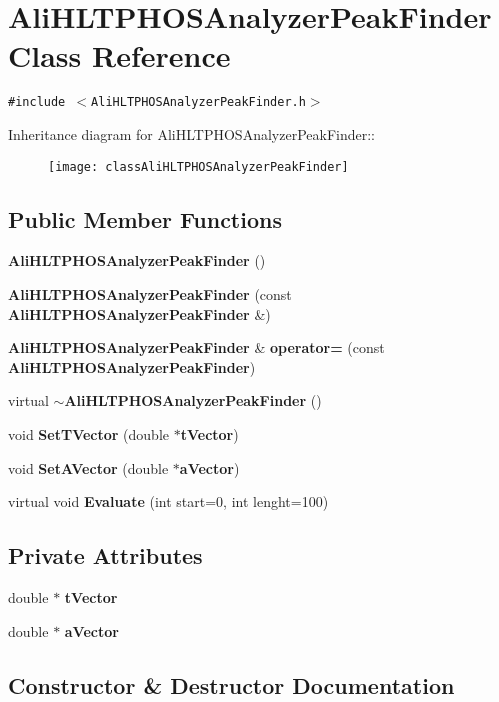 \section{Ali\-HLTPHOSAnalyzer\-Peak\-Finder Class Reference}
\label{classAliHLTPHOSAnalyzerPeakFinder}
{\tt \#include $<$Ali\-HLTPHOSAnalyzer\-Peak\-Finder.h$>$}

Inheritance diagram for Ali\-HLTPHOSAnalyzer\-Peak\-Finder::\begin{figure}[H]
\begin{center}
\leavevmode
\texttt{[image: classAliHLTPHOSAnalyzerPeakFinder]}
\end{center}
\end{figure}
\subsection*{Public Member Functions}
\begin{CompactItemize}
\item 
{\bf Ali\-HLTPHOSAnalyzer\-Peak\-Finder} ()
\item 
{\bf Ali\-HLTPHOSAnalyzer\-Peak\-Finder} (const {\bf Ali\-HLTPHOSAnalyzer\-Peak\-Finder} \&)
\item 
{\bf Ali\-HLTPHOSAnalyzer\-Peak\-Finder} \& {\bf operator=} (const {\bf Ali\-HLTPHOSAnalyzer\-Peak\-Finder})
\item 
virtual {\bf $\sim$Ali\-HLTPHOSAnalyzer\-Peak\-Finder} ()
\item 
void {\bf Set\-TVector} (double $\ast${\bf t\-Vector})
\item 
void {\bf Set\-AVector} (double $\ast${\bf a\-Vector})
\item 
virtual void {\bf Evaluate} (int start=0, int lenght=100)
\end{CompactItemize}
\subsection*{Private Attributes}
\begin{CompactItemize}
\item 
double $\ast$ {\bf t\-Vector}
\item 
double $\ast$ {\bf a\-Vector}
\end{CompactItemize}


\subsection{Constructor \& Destructor Documentation}

